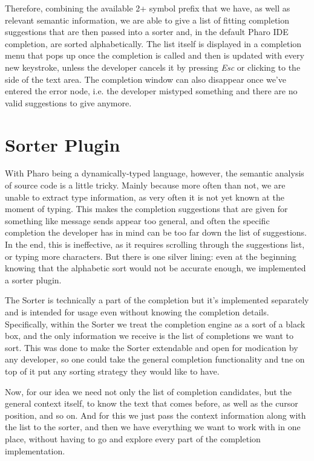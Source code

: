 Therefore, combining the available 2+ symbol prefix that we have, as well as relevant semantic information, we are able to give a list of fitting completion suggestions that are then passed into a sorter and, in the default Pharo IDE completion, are sorted alphabetically. The list itself is displayed in a completion menu that pops up once the completion is called and then is updated with every new keystroke, unless the developer cancels it by pressing \textit{Esc} or clicking to the side of the text area. The completion window can also disappear once we've entered the error node, i.e. the developer mistyped something and there are no valid suggestions to give anymore.

\section{Sorter Plugin}
With Pharo being a dynamically-typed language, however, the semantic analysis of source code is a little tricky. Mainly because more often than not, we are unable to extract type information, as very often it is not yet known at the moment of typing. This makes the completion suggestions that are given for something like message sends appear too general, and often the specific completion the developer has in mind can be too far down the list of suggestions. In the end, this is ineffective, as it requires scrolling through the suggestions list, or typing more characters. But there is one silver lining: even at the beginning knowing that the alphabetic sort would not be accurate enough, we implemented a sorter plugin.

The Sorter is technically a part of the completion but it's implemented separately and is intended for usage even without knowing the completion details. Specifically, within the Sorter we treat the completion engine as a sort of a black box, and the only information we receive is the list of completions we want to sort. This was done to make the Sorter extendable and open for modication by any developer, so one could take the general completion functionality and tne on top of it put any sorting strategy they would like to have.

Now, for our idea we need not only the list of completion candidates, but the general context itself, to know the text that comes before, as well as the cursor position, and so on. And for this we just pass the context information along with the list to the sorter, and then we have everything we want to work with in one place, without having to go and explore every part of the completion implementation.